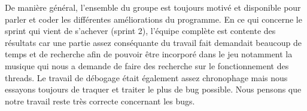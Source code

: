 De manière général, l'ensemble du groupe est toujours motivé et disponible pour parler et coder les différentes améliorations
du programme. En ce qui concerne le sprint qui vient de s'achever (sprint 2), l'équipe complète est contente des résultats 
car une partie assez conséquante du travail fait demandait beaucoup de temps et de recherche afin de pouvoir être incorporé
dans le jeu notamment la musique qui nous a demande de faire des recherche sur le fonctionnement des threads. Le travail de 
débogage était également assez chronophage mais nous essayons toujours de traquer et traiter le plus de bug possible. Nous 
pensons que notre travail reste très correcte concernant les bugs. 